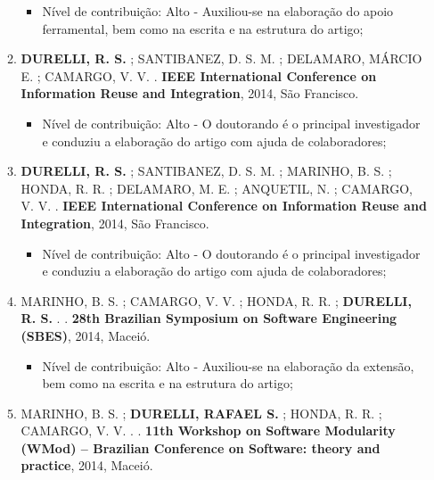 \begin{itemize}
\begin{enumerate}
		    \begin{itemize}
			        \item Nível de contribuição: Alto - Auxiliou-se na elaboração do apoio ferramental, bem como na escrita e na estrutura do artigo;
			    \end{itemize}
		
		\item \textbf{DURELLI, R. S.} ; SANTIBANEZ, D. S. M. ; DELAMARO, MÁRCIO E. ; CAMARGO, V. V. . \textbf{IEEE International Conference on Information Reuse and Integration}, 2014, São Francisco.
		
		    \begin{itemize}
			        \item Nível de contribuição: Alto - O doutorando é o principal investigador e conduziu a elaboração do artigo com ajuda de colaboradores;
			    \end{itemize}
		
		\item \textbf{DURELLI, R. S.} ; SANTIBANEZ, D. S. M. ; MARINHO, B. S. ; HONDA, R. R. ; DELAMARO, M. E. ; ANQUETIL, N. ; CAMARGO, V. V. . \textbf{IEEE International Conference on Information Reuse and Integration}, 2014, São Francisco.
		    \begin{itemize}
			        \item Nível de contribuição: Alto - O doutorando é o principal investigador e conduziu a elaboração do artigo com ajuda de colaboradores;
			    \end{itemize}
		
		\item MARINHO, B. S. ; CAMARGO, V. V. ; HONDA, R. R. ; \textbf{DURELLI, R. S.} . . \textbf{28th Brazilian Symposium on Software Engineering (SBES)}, 2014, Maceió.
		
		    \begin{itemize}
			        \item Nível de contribuição: Alto - Auxiliou-se na elaboração da extensão, bem como na escrita e na estrutura do artigo;
			    \end{itemize}
		
		\item MARINHO, B. S. ; \textbf{DURELLI, RAFAEL S.} ; HONDA, R. R. ; CAMARGO, V. V. . . \textbf{11th Workshop on Software Modularity (WMod) -- Brazilian Conference on Software: theory and practice}, 2014, Maceió.
		

\end{enumerate}
\end{itemize}
